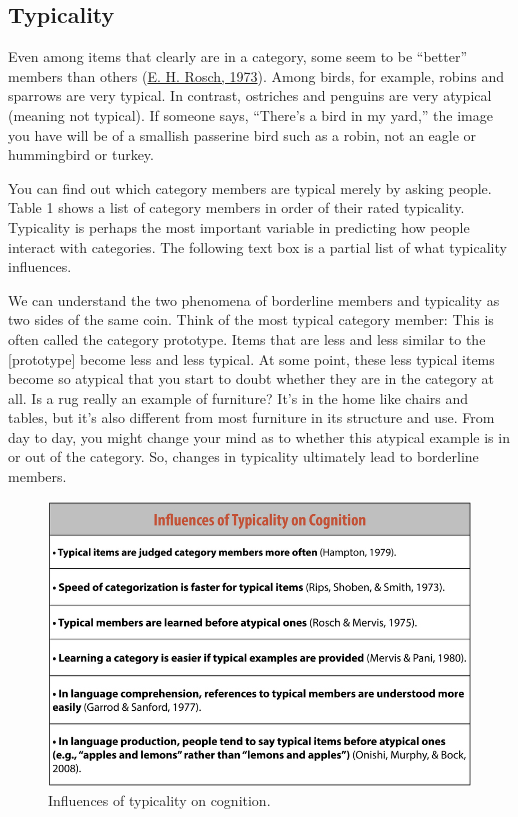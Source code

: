 \documentclass[
]{krantz}
\begin{document}
\hypertarget{typicality}{%
\subsection*{Typicality}\label{typicality}}


Even among items that clearly are in a category, some seem to be ``better'' members than others (\protect\hyperlink{ref-Rosch1973}{E. H. Rosch, 1973}). Among birds, for example, robins and sparrows are very typical. In contrast, ostriches and penguins are very atypical (meaning not typical). If someone says, ``There's a bird in my yard,'' the image you have will be of a smallish passerine bird such as a robin, not an eagle or hummingbird or turkey.

You can find out which category members are typical merely by asking people. Table 1 shows a list of category members in order of their rated typicality. Typicality is perhaps the most important variable in predicting how people interact with categories. The following text box is a partial list of what typicality influences.

We can understand the two phenomena of borderline members and typicality as two sides of the same coin. Think of the most typical category member: This is often called the category prototype. Items that are less and less similar to the {[}prototype{]} become less and less typical. At some point, these less typical items become so atypical that you start to doubt whether they are in the category at all. Is a rug really an example of furniture? It's in the home like chairs and tables, but it's also different from most furniture in its structure and use. From day to day, you might change your mind as to whether this atypical example is in or out of the category. So, changes in typicality ultimately lead to borderline members.

\begin{figure}

{\centering \includegraphics[width=0.8\linewidth]{images/ch7/textbox1} 

}

\caption{Influences of typicality on cognition.}\label{fig:textbox1}
\end{figure}
\end{document}
